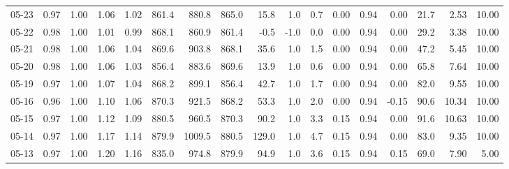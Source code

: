\begin{threeparttable}
{\begin{tabular}{lrrrrrrrrrrrrrrrr}
  05-23 &         0.97 &           1.00 &          1.06 &          1.02 & 861.4 &  880.8 & 865.0 &       15.8 &                      1.0 &                 0.7 &       0.00 &      0.94 &           0.00 &             21.7 &            2.53 &                  10.00 \\
  05-22 &         0.98 &           1.00 &          1.01 &          0.99 & 868.1 &  860.9 & 861.4 &       -0.5 &                     -1.0 &                 0.0 &       0.00 &      0.94 &           0.00 &             29.2 &            3.38 &                  10.00 \\
  05-21 &         0.98 &           1.00 &          1.06 &          1.04 & 869.6 &  903.8 & 868.1 &       35.6 &                      1.0 &                 1.5 &       0.00 &      0.94 &           0.00 &             47.2 &            5.45 &                  10.00 \\
  05-20 &         0.98 &           1.00 &          1.06 &          1.03 & 856.4 &  883.6 & 869.6 &       13.9 &                      1.0 &                 0.6 &       0.00 &      0.94 &           0.00 &             65.8 &            7.64 &                  10.00 \\
  05-19 &         0.97 &           1.00 &          1.07 &          1.04 & 868.2 &  899.1 & 856.4 &       42.7 &                      1.0 &                 1.7 &       0.00 &      0.94 &           0.00 &             82.0 &            9.55 &                  10.00 \\
  05-16 &         0.96 &           1.00 &          1.10 &          1.06 & 870.3 &  921.5 & 868.2 &       53.3 &                      1.0 &                 2.0 &       0.00 &      0.94 &          -0.15 &             90.6 &           10.34 &                  10.00 \\
  05-15 &         0.97 &           1.00 &          1.12 &          1.09 & 880.5 &  960.5 & 870.3 &       90.2 &                      1.0 &                 3.3 &       0.15 &      0.94 &           0.00 &             91.6 &           10.63 &                  10.00 \\
  05-14 &         0.97 &           1.00 &          1.17 &          1.14 & 879.9 & 1009.5 & 880.5 &      129.0 &                      1.0 &                 4.7 &       0.15 &      0.94 &           0.00 &             83.0 &            9.35 &                  10.00 \\
  05-13 &         0.97 &           1.00 &          1.20 &          1.16 & 835.0 &  974.8 & 879.9 &       94.9 &                      1.0 &                 3.6 &       0.15 &      0.94 &           0.15 &             69.0 &            7.90 &                   5.00 \\

\end{tabular}}
\end{threeparttable}

